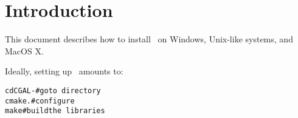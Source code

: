 %

\newcommand{\cmake}{CMake}
\newcommand{\cpack}{CPack}
\newcommand{\nsis}{NullSoft Scriptable Installer}


\newcommand{\MSInst}{Windows-specific Installation}

\newcommand{\Gcc}[1]{\gnu~\texttt{g++}~{\rm #1}}
\newcommand{\gccurl}{\path'http://gcc.gnu.org/'}

\newcommand{\sunprocc}[1]{\textsc{Sunpro}~\texttt{CC}~{\rm #1}}
\newcommand{\sunproccurl}{\path'http://developers.sun.com/sunstudio/'}

\newcommand{\bcc}[1]{\textsc{Borland}~\texttt{C++}~{\rm #1}}
\newcommand{\bccurl}{\path'http://www.inprise.com/bcppbuilder/'}

\newcommand{\msvc}[1]{\textsc{MS}~Visual~\texttt{C++}~{\rm #1}}
\newcommand{\msvcurl}{\path'http://msdn.microsoft.com/en-us/vstudio/'}

\newcommand{\icl}[1]{\textsc{Intel}~\texttt{C++}~{\rm #1}}
\newcommand{\iclurl}{\path'http://software.intel.com/en-us/intel-compilers/'}

\newcommand{\mswin}{\textsc{MS}~Windows}

\newcommand{\cgalrel}{\texttt{CGAL-\cgalversionnumber}}


\newcommand{\TTindex}[1]{\index{#1@{\tt #1}}}
\newcommand{\TTsubindex}[2]{\index{#1@{\tt #1}!{#2}}}
\newcommand{\TTsubindextwo}[2]{\index{#1!#2@{\tt #2} }}

\section{Introduction}

This document describes how to install \cgal\ on Windows, Unix-like systems, and MacOS X.

Ideally, setting up \cgal\ amounts to:

\begin{alltt}
  cd  \cgalrel                                # go to \cgal\ directory
  cmake .                                     # configure \cgal
  make                                        # build the \cgal\ libraries
\end{alltt}

